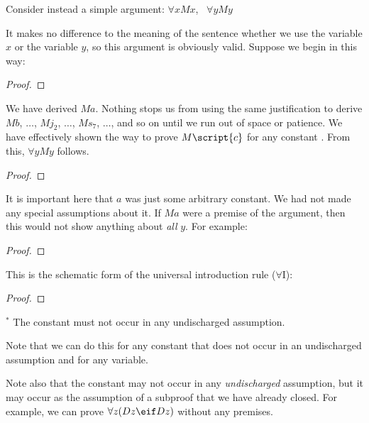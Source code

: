 Consider instead a simple argument: $\forall x Mx$, \therefore\ $\forall y My$

It makes no difference to the meaning of the sentence whether we use the variable $x$ or the variable $y$, so this argument is obviously valid. Suppose we begin in this way:

\begin{proof}
	 
	 
\end{proof}

We have derived $Ma$. Nothing stops us from using the same justification to derive $Mb$, $\ldots$, $Mj_2$, $\ldots$, $Ms_7$, $\ldots$, and so on until we run out of space or patience. We have effectively shown the way to prove $M\script{c}$ for any constant . From this, $\forall y My$ follows.



\begin{proof}
	 
	 
\end{proof}

It is important here that $a$ was just some arbitrary constant. We had not made any special assumptions about it. If $Ma$ were a premise of the argument, then this would not show anything about \emph{all} $y$. For example:

\begin{proof}
	 
	 
\end{proof}


This is the schematic form of the universal introduction rule ($\forall$I):

\begin{proof}
	 
\end{proof}
$^\ast$ The constant  must not occur in any undischarged assumption.

Note that we can do this for any constant that does not occur in an undischarged assumption and for any variable.

Note also that the constant may not occur in any \emph{undischarged} assumption, but it may occur as the assumption of a subproof that we have already closed. For example, we can prove $\forall z(Dz \eif Dz)$ without any premises.

